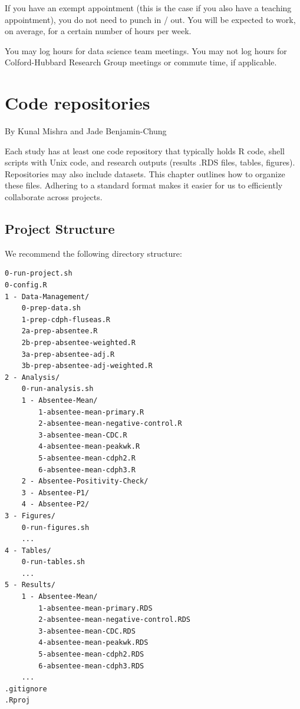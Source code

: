 \documentclass[]{book}
\begin{document}
If you have an exempt appointment (this is the case if you also have a teaching appointment), you do not need to punch in / out. You will be expected to work, on average, for a certain number of hours per week.

You may log hours for data science team meetings. You may not log hours for Colford-Hubbard Research Group meetings or commute time, if applicable.

\hypertarget{code-repositories}{%
\chapter{Code repositories}\label{code-repositories}}

By Kunal Mishra and Jade Benjamin-Chung

Each study has at least one code repository that typically holds R code, shell scripts with Unix code, and research outputs (results .RDS files, tables, figures). Repositories may also include datasets. This chapter outlines how to organize these files. Adhering to a standard format makes it easier for us to efficiently collaborate across projects.

\hypertarget{project-structure}{%
\section{Project Structure}\label{project-structure}}

We recommend the following directory structure:

\begin{verbatim}
0-run-project.sh
0-config.R
1 - Data-Management/
    0-prep-data.sh
    1-prep-cdph-fluseas.R
    2a-prep-absentee.R
    2b-prep-absentee-weighted.R
    3a-prep-absentee-adj.R
    3b-prep-absentee-adj-weighted.R
2 - Analysis/
    0-run-analysis.sh
    1 - Absentee-Mean/
        1-absentee-mean-primary.R
        2-absentee-mean-negative-control.R
        3-absentee-mean-CDC.R
        4-absentee-mean-peakwk.R
        5-absentee-mean-cdph2.R
        6-absentee-mean-cdph3.R
    2 - Absentee-Positivity-Check/
    3 - Absentee-P1/
    4 - Absentee-P2/
3 - Figures/
    0-run-figures.sh
    ...
4 - Tables/
    0-run-tables.sh
    ...
5 - Results/
    1 - Absentee-Mean/
        1-absentee-mean-primary.RDS
        2-absentee-mean-negative-control.RDS
        3-absentee-mean-CDC.RDS
        4-absentee-mean-peakwk.RDS
        5-absentee-mean-cdph2.RDS
        6-absentee-mean-cdph3.RDS
    ...
.gitignore
.Rproj
\end{verbatim}
\end{document}

